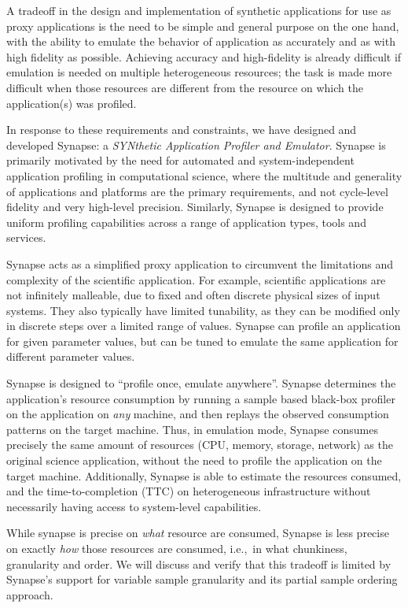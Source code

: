 \documentclass[10pt, conference, compsocconf]{IEEEtran}
\newcommand{\I}[1]{\textit{#1}\xspace}
\newcommand{\synapse}{Synapse\xspace}
\begin{document}
A tradeoff in the design and implementation of synthetic applications for use as
proxy applications is the need to be simple and general purpose on the one hand,
with the ability to emulate the behavior of application as accurately and as
with high fidelity as possible.  Achieving accuracy and high-fidelity is already
difficult if emulation is needed on multiple heterogeneous resources; the task
is made more difficult when those resources are different from the resource on
which the application(s) was profiled.

In response to these requirements and constraints, we have designed and
developed \synapse: a \I{SYNthetic Application Profiler and Emulator}.  \synapse
is primarily motivated by the need for automated and system-independent
application profiling in computational science, where the multitude and
generality of applications and platforms are the primary requirements, and not
cycle-level fidelity and very high-level precision.  Similarly, \synapse is
designed to provide uniform profiling capabilities across a range of application
types, tools and services.

\synapse acts as a simplified proxy application to circumvent the limitations
and complexity of the scientific application. For example, scientific
applications are not infinitely malleable, due to fixed and often discrete
physical sizes of input systems. They also typically have limited tunability, as
they can be modified only in discrete steps over a limited range of
values. \synapse can profile an application for given parameter values, but can
be tuned to emulate the same application for different parameter values.

\synapse is designed to ``profile once, emulate anywhere''.  \synapse determines
the application's resource consumption by running a sample based black-box
profiler on the application on \I{any} machine, and then replays the observed
consumption patterns on the target machine.  Thus, in emulation mode, \synapse
consumes precisely the same amount of resources (CPU, memory, storage, network)
as the original science application, without the need to profile the application
on the target machine.  Additionally, \synapse is able to estimate the resources
consumed, and the time-to-completion (TTC) on heterogeneous infrastructure
without necessarily having access to system-level capabilities.



While synapse is precise on \I{what} resource are consumed, \synapse is less
precise on exactly \I{how} those resources are consumed, i.e.,~in what
chunkiness, granularity and order.  We will discuss and verify that this
tradeoff is limited by \synapse's support for variable sample granularity and
its partial sample ordering approach.
\end{document}
